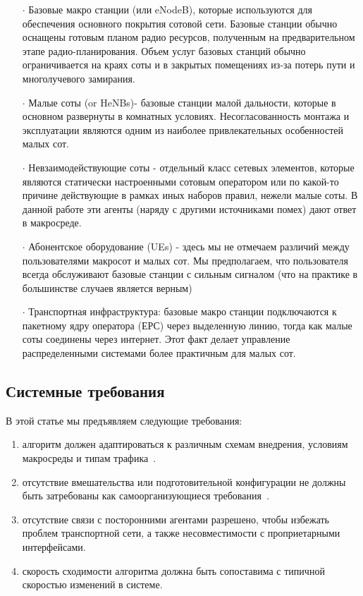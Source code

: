 \begin{itemize}
\item[$\cdot$] Базовые макро станции (или eNodeB), которые используются для обеспечения основного покрытия сотовой сети. Базовые станции обычно оснащены готовым планом радио ресурсов, полученным на предварительном этапе радио-планирования. Объем услуг базовых станций обычно ограничивается на краях соты и в закрытых помещениях из-за потерь пути и многолучевого замирания. 
\item[$\cdot$] Малые соты (or HeNBs)- базовые станции малой дальности, которые в основном развернуты в комнатных условиях. Несогласованность монтажа и эксплуатации являются одним из наиболее привлекательных особенностей малых сот.
\item[$\cdot$] Невзаимодействующие соты - отдельный класс сетевых элементов, которые являются статически настроенными сотовым оператором или по какой-то причине действующие в рамках иных наборов правил, нежели малые соты. В данной работе эти агенты (наряду с другими источниками помех) дают ответ в макросреде.
\item[$\cdot$] Абонентское оборудование (UEs) - здесь мы не отмечаем различий между пользователями макросот и малых сот. Мы предполагаем, что пользователя всегда обслуживают базовые станции с сильным сигналом (что на практике в большинстве случаев является верным)
\item[$\cdot$] Транспортная инфраструктура: базовые макро станции подключаются к пакетному ядру оператора (ЕРС) через выделенную линию, тогда как малые соты соединены через интернет. Этот факт делает управление распределенными системами более практичным для малых сот.
\end{itemize}

\subsection{Системные требования}
В этой статье мы предъявляем следующие требования:
\begin{enumerate}
\item алгоритм должен адаптироваться к различным схемам внедрения, условиям макросреды и типам трафика~\cite{TS36.300}.
\item отсутствие вмешательства или подготовительной конфигурации не должны быть затребованы как самоорганизующиеся требования~\cite{TS36.902}.
\item отсутствие связи с посторонними агентами разрешено, чтобы избежать проблем транспортной сети, а также несовместимости с проприетарными интерфейсами.
\item скорость сходимости алгоритма должна быть сопоставима с типичной скоростью изменений в системе.
\end{enumerate}

